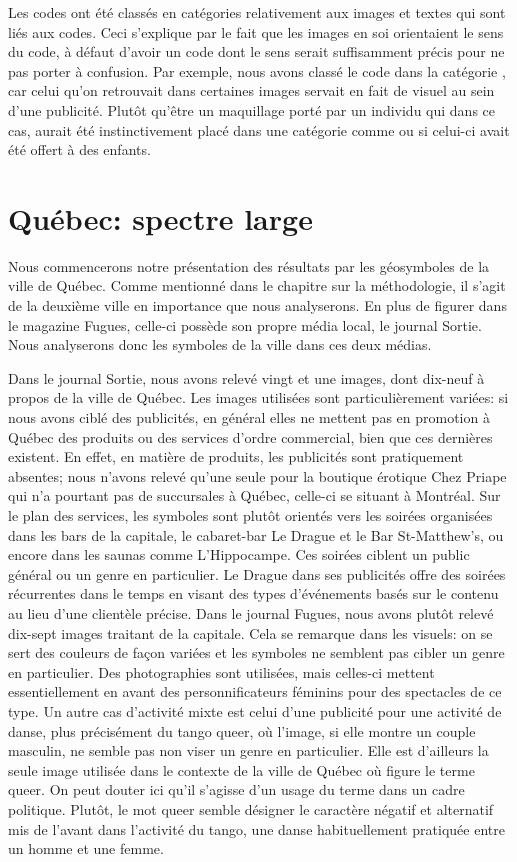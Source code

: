 Les codes ont été classés en catégories relativement aux images et textes qui sont liés aux codes.
Ceci s'explique par le fait que les images en soi orientaient le sens du code, à défaut d'avoir un code dont le sens serait suffisamment précis pour ne pas porter à confusion.
Par exemple, nous avons classé le code  dans la catégorie , car celui qu'on retrouvait dans certaines images servait en fait de visuel au sein d'une publicité.
Plutôt qu'être un maquillage porté par un individu qui dans ce cas, aurait été instinctivement placé dans une catégorie comme  ou  si celui-ci avait été offert à des enfants.

\section{Québec: spectre large}
\label{sec:qu_bec_spectre_large}
Nous commencerons notre présentation des résultats par les géosymboles de la ville de Québec.
Comme mentionné dans le chapitre sur la méthodologie, il s'agit de la deuxième ville en importance que nous analyserons.
En plus de figurer dans le magazine Fugues, celle-ci possède son propre média local, le journal Sortie.
Nous analyserons donc les symboles de la ville dans ces deux médias.

Dans le journal Sortie, nous avons relevé vingt et une images, dont dix-neuf à propos de la ville de Québec.
Les images utilisées sont particulièrement variées: si nous avons ciblé des publicités, en général elles ne mettent pas en promotion à Québec des produits ou des services d'ordre commercial, bien que ces dernières existent.
En effet, en matière de produits, les publicités sont pratiquement absentes; nous n'avons relevé qu'une seule pour la boutique érotique Chez Priape qui n'a pourtant pas de succursales à Québec, celle-ci se situant à Montréal.
Sur le plan des services, les symboles sont plutôt orientés vers les soirées organisées dans les bars de la capitale, le cabaret-bar Le Drague et le Bar St-Matthew’s, ou encore dans les saunas comme L'Hippocampe.
Ces soirées ciblent un public général ou un genre en particulier.
Le Drague dans ses publicités offre des soirées récurrentes dans le temps en visant des types d'événements basés sur le contenu au lieu d'une clientèle précise.
Dans le journal Fugues, nous avons plutôt relevé dix-sept images traitant de la capitale.
Cela se remarque dans les visuels: on se sert des couleurs de façon variées et les symboles ne semblent pas cibler un genre en particulier.
Des photographies sont utilisées, mais celles-ci mettent essentiellement en avant des personnificateurs féminins pour des spectacles de ce type.
Un autre cas d'activité mixte est celui d'une publicité pour une activité de danse, plus précisément du tango queer, où l'image, si elle montre un couple masculin, ne semble pas non viser un genre en particulier.
Elle est d'ailleurs la seule image utilisée dans le contexte de la ville de Québec où figure le terme queer.
On peut douter ici qu'il s'agisse d'un usage du terme dans un cadre politique.
Plutôt, le mot queer semble désigner le caractère négatif et alternatif mis de l'avant dans l'activité du tango, une danse habituellement pratiquée entre un homme et une femme.


